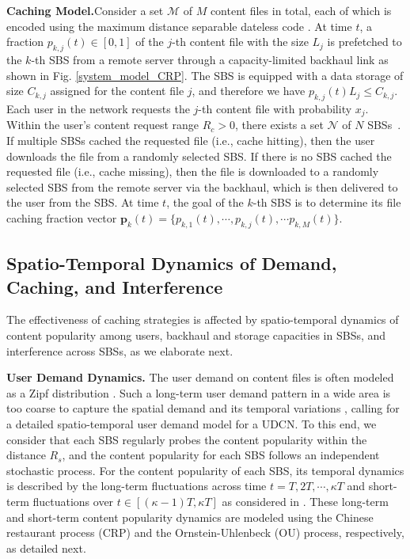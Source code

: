 \documentclass{book}
\begin{document}
\textbf{Caching Model.}\quad Consider a set $\mathcal{M}$ of $M$ content files in total, each of which is encoded using the maximum distance separable dateless code \cite{MDS}. At time $t$, a fraction $p_{k,j}(t)\in[0,1]$ of the $j$-th content file with the size $L_j$ is prefetched to the $k$-th SBS from a remote server through a capacity-limited backhaul link as shown in Fig. \ref{system_model_CRP}. The SBS is equipped with a data storage of size $C_{k,j}$ assigned for the content file $j$, and therefore we have $p_{k,j}(t) L_j \leq C_{k,j}$. Each user in the network requests the $j$-th content file with probability $x_j$. Within the user's content request range $R_c>0$, there exists a set $\mathcal{N}$ of $N$ SBSs~\cite{interf_udn}. If multiple SBSs cached the requested file (i.e., cache hitting), then the user downloads the file from a randomly selected SBS. If there is no SBS cached the requested file (i.e., cache missing), then the file is downloaded to a randomly selected SBS from the remote server via the backhaul, which is then delivered to the user from the SBS. At time $t$, the goal of the $k$-th SBS is to determine its file caching fraction vector $\boldsymbol{p}_k(t)=\{p_{k,1}(t),\cdots,p_{k,j}(t),\cdots p_{k,M}(t)\}$.


\subsection{Spatio-Temporal Dynamics of Demand, Caching, and Interference} \label{C-st dynamics}

The effectiveness of caching strategies is affected by spatio-temporal dynamics of content popularity among users, backhaul and storage capacities in SBSs, and interference across SBSs, as we elaborate next.


\textbf{User Demand Dynamics.}
The user demand on content files is often modeled as a Zipf distribution \cite{Zipf_1}. Such a long-term user demand pattern in a wide area is too coarse to capture the spatial demand and its temporal variations \cite{local_global}, calling for a detailed spatio-temporal user demand model for a UDCN. To this end, we consider that each SBS regularly probes the content popularity within the distance $R_s$, and the content popularity for each SBS follows an independent stochastic process. For the content popularity of each SBS, its temporal dynamics is described by the long-term fluctuations across time $t=T, 2T, \cdots ,\kappa T$ and short-term fluctuations over $t\in[(\kappa-1)T,\kappa T]$ as considered in \cite{MR_model}. These long-term and short-term content popularity dynamics are modeled using the Chinese restaurant process (CRP) and the Ornstein-Uhlenbeck (OU) process, respectively, as detailed next.
\end{document}
